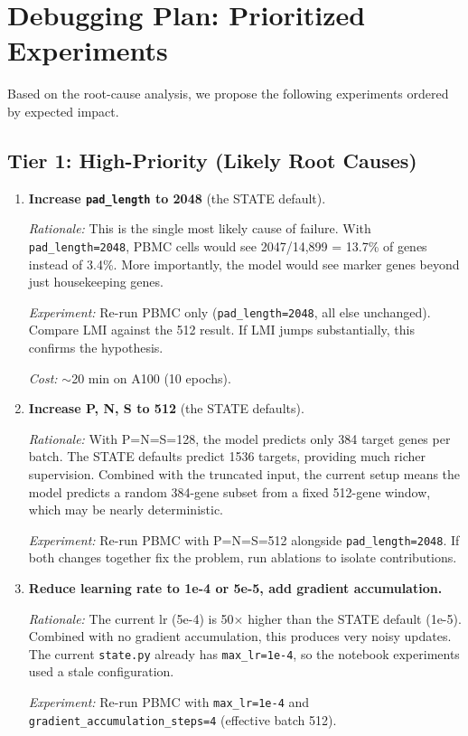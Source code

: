 \documentclass[11pt,a4paper]{article}
\begin{document}
\section{Debugging Plan: Prioritized Experiments}

Based on the root-cause analysis, we propose the following experiments ordered by expected impact.

\subsection{Tier 1: High-Priority (Likely Root Causes)}

\begin{enumerate}
    \item \textbf{Increase \texttt{pad\_length} to 2048} (the STATE default).

    \textit{Rationale:} This is the single most likely cause of failure. With \texttt{pad\_length=2048}, PBMC cells would see 2047/14,899 = 13.7\% of genes instead of 3.4\%. More importantly, the model would see marker genes beyond just housekeeping genes.

    \textit{Experiment:} Re-run PBMC only (\texttt{pad\_length=2048}, all else unchanged). Compare LMI against the 512 result. If LMI jumps substantially, this confirms the hypothesis.

    \textit{Cost:} $\sim$20 min on A100 (10 epochs).

    \item \textbf{Increase P, N, S to 512} (the STATE defaults).

    \textit{Rationale:} With P=N=S=128, the model predicts only 384 target genes per batch. The STATE defaults predict 1536 targets, providing much richer supervision. Combined with the truncated input, the current setup means the model predicts a random 384-gene subset from a fixed 512-gene window, which may be nearly deterministic.

    \textit{Experiment:} Re-run PBMC with P=N=S=512 alongside \texttt{pad\_length=2048}. If both changes together fix the problem, run ablations to isolate contributions.

    \item \textbf{Reduce learning rate to 1e-4 or 5e-5, add gradient accumulation.}

    \textit{Rationale:} The current lr (5e-4) is 50$\times$ higher than the STATE default (1e-5). Combined with no gradient accumulation, this produces very noisy updates. The current \texttt{state.py} already has \texttt{max\_lr=1e-4}, so the notebook experiments used a stale configuration.

    \textit{Experiment:} Re-run PBMC with \texttt{max\_lr=1e-4} and \texttt{gradient\_accumulation\_steps=4} (effective batch 512).
\end{enumerate}
\end{document}
